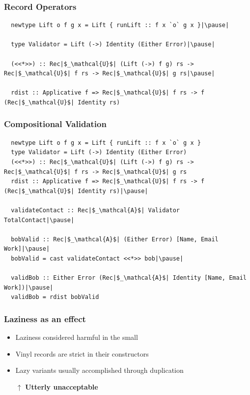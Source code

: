\documentclass[12pt]{beamer}
\begin{document}
\begin{frame}[fragile]
  \frametitle{Record Operators}\pause

  \begin{lstlisting}
  newtype Lift o f g x = Lift { runLift :: f x `o` g x }|\pause|

  type Validator = Lift (->) Identity (Either Error)|\pause|

  (<<*>>) :: Rec|$_\mathcal{U}$| (Lift (->) f g) rs -> Rec|$_\mathcal{U}$| f rs -> Rec|$_\mathcal{U}$| g rs|\pause|

  rdist :: Applicative f => Rec|$_\mathcal{U}$| f rs -> f (Rec|$_\mathcal{U}$| Identity rs)
  \end{lstlisting}
\end{frame}

\begin{frame}[fragile]
  \frametitle{Compositional Validation}

  \begin{lstlisting}
  newtype Lift o f g x = Lift { runLift :: f x `o` g x }
  type Validator = Lift (->) Identity (Either Error)
  (<<*>>) :: Rec|$_\mathcal{U}$| (Lift (->) f g) rs -> Rec|$_\mathcal{U}$| f rs -> Rec|$_\mathcal{U}$| g rs
  rdist :: Applicative f => Rec|$_\mathcal{U}$| f rs -> f (Rec|$_\mathcal{U}$| Identity rs)|\pause|

  validateContact :: Rec|$_\mathcal{A}$| Validator TotalContact|\pause|

  bobValid :: Rec|$_\mathcal{A}$| (Either Error) [Name, Email Work]|\pause|
  bobValid = cast validateContact <<*>> bob|\pause|

  validBob :: Either Error (Rec|$_\mathcal{A}$| Identity [Name, Email Work])|\pause|
  validBob = rdist bobValid
  \end{lstlisting}
\end{frame}

\begin{frame}
  \frametitle{Laziness as an effect}\pause

  \begin{itemize}
    \item Laziness considered harmful in the small\pause
    \item Vinyl records are strict in their constructors\pause
    \item Lazy variants usually accomplished through duplication\pause
    \item[$\uparrow$] \textbf{Utterly unacceptable}
  \end{itemize}
\end{frame}
\end{document}
